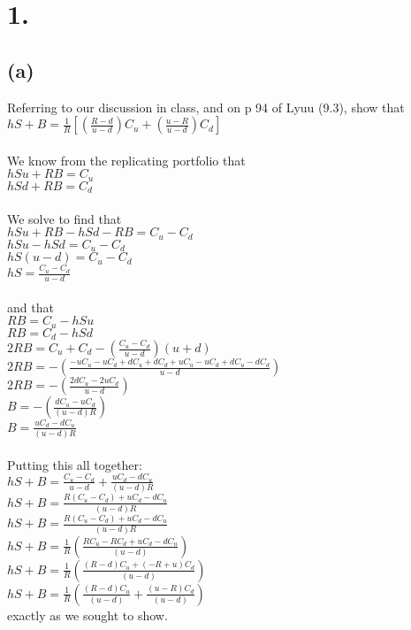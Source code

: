 \documentclass{article}
\begin{document}
\thispagestyle{firstpageheader}

\section*{1.}
{\Large 

\subsection*{(a)}

Referring to our discussion in class, and on p 94 of Lyuu (9.3), show that \\
$hS + B = \frac{1}{R}[(\frac{R - d}{u - d})C_u + (\frac{u - R}{u - d})C_d] $ \\ \\ 

We know from the replicating portfolio that \\ 
$hSu + RB = C_u$ \\ 
$hSd + RB = C_d$ \\ \\
We solve to find that \\
$hSu + RB - hSd - RB = C_u - C_d$ \\
$hSu - hSd = C_u - C_d$ \\
$hS(u - d) = C_u - C_d$ \\
$hS = \frac{C_u - C_d}{u - d}$ \\ \\
and that \\
$RB = C_u - hSu$ \\
$RB = C_d - hSd$ \\
$2RB = C_u + C_d - (\frac{C_u - C_d}{u - d})(u + d)$ \\ 
$2RB = - (\frac{- uC_u - uC_d + dC_u + dC_d + uC_u - uC_d + dC_u - dC_d}{u - d})$ \\ 
$2RB = - (\frac{2dC_u - 2uC_d}{u - d})$ \\ 
$B = - (\frac{dC_u - uC_d}{(u - d)R})$ \\ 
$B = \frac{uC_d - dC_u}{(u - d)R}$ \\ \\
Putting this all together: \\
$hS + B = \frac{C_u - C_d}{u - d} + \frac{uC_d - dC_u}{(u - d)R}$ \\
$hS + B = \frac{R(C_u - C_d) + uC_d - dC_u}{(u - d)R}$ \\
$hS + B = \frac{R(C_u - C_d) + uC_d - dC_u}{(u - d)R}$ \\
$hS + B = \frac{1}{R}(\frac{RC_u - RC_d + uC_d - dC_u}{(u - d)})$ \\
$hS + B = \frac{1}{R}(\frac{(R-d)C_u + (-R+u)C_d}{(u - d)})$ \\
$hS + B = \frac{1}{R}(\frac{(R-d)C_u}{(u-d)} + \frac{(u-R)C_d}{(u - d)})$ \\
exactly as we sought to show.

}
\end{document}
